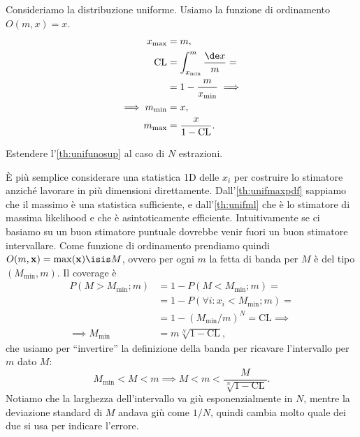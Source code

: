 \begin{example}
	\label{th:unifunosup}
	Consideriamo la distribuzione uniforme.
	Usiamo la funzione di ordinamento $O(m,x)=x$.
	\begin{align*}
		x_\mathrm{max}
		&= m, \\
		\mathrm{CL}
		&= \int_{x_\mathrm{min}}^m \frac{\de x}{m} = \\
		&= 1 - \frac m{x_\mathrm{min}} \implies \\
		\implies m_\mathrm{min}
		&= x, \\
		m_\mathrm{max}
		&= \frac x{1-\mathrm{CL}}.
	\end{align*}
\end{example}

\begin{exercise}
	\label{th:unifsup}
	Estendere l'\autoref{th:unifunosup} al caso di $N$ estrazioni.
\end{exercise}

\begin{solution}
    È più semplice considerare una statistica 1D delle $x_i$ per costruire lo
    stimatore anziché lavorare in più dimensioni direttamente.
    Dall'\autoref{th:unifmaxpdf} sappiamo che il massimo è una statistica
    sufficiente, e dall'\autoref{th:unifml} che è lo stimatore di massima
    likelihood e che è asintoticamente efficiente. Intuitivamente se ci basiamo
    su un buon stimatore puntuale dovrebbe venir fuori un buon stimatore
    intervallare.
    Come funzione di ordinamento prendiamo quindi $O(m, \mathbf x) =
    \max(\mathbf x) \isis M$, ovvero per ogni $m$ la fetta di banda per
    $M$ è del tipo $(M_\text{min}, m)$. Il coverage è
    \begin{align*}
        P(M > M_\text{min};m)
        &= 1 - P(M < M_\text{min};m) = \\
        &= 1 - P(\forall i:x_i < M_\text{min};m) = \\
        &= 1 - (M_\text{min}/m)^N = \mathrm{CL} \implies \\
        \implies M_\text{min} &= m\sqrt[N]{1 - \mathrm{CL}},
    \end{align*}
    che usiamo per ``invertire'' la definizione della banda per ricavare
    l'intervallo per $m$ dato $M$:
    \begin{equation*}
        M_\text{min} < M < m
        \implies M < m < \frac{M}{\sqrt[N]{1-\mathrm{CL}}}.
    \end{equation*}
    Notiamo che la larghezza dell'intervallo va giù esponenzialmente in $N$,
    mentre la deviazione standard di $M$ andava giù come $1/N$, quindi cambia
    molto quale dei due si usa per indicare l'errore.
\end{solution}

